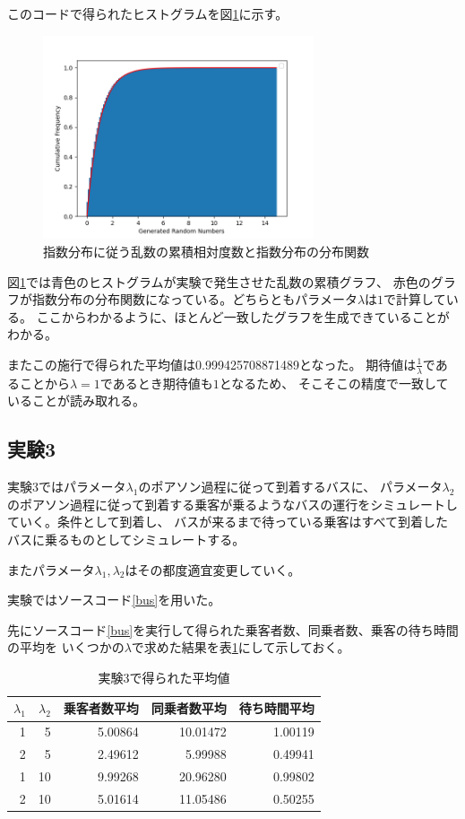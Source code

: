 \documentclass[a4paper,11pt,dvipdfmx]{jsarticle}
\begin{document}
このコードで得られたヒストグラムを図\ref{expohist}に示す。
\begin{figure}[h]
\centering
\includegraphics[width=80mm]{Exporand.png}
\caption{指数分布に従う乱数の累積相対度数と指数分布の分布関数}
\label{expohist}
\end{figure}

図\ref{expohist}では青色のヒストグラムが実験で発生させた乱数の累積グラフ、
赤色のグラフが指数分布の分布関数になっている。どちらともパラメータ$\lambda$は$1$で計算している。
ここからわかるように、ほとんど一致したグラフを生成できていることがわかる。

またこの施行で得られた平均値は0.999425708871489となった。
期待値は$\frac{1}{\lambda}$であることから$\lambda=1$であるとき期待値も$1$となるため、
そこそこの精度で一致していることが読み取れる。

\subsection{実験3}
実験3ではパラメータ$\lambda_1$のポアソン過程に従って到着するバスに、
パラメータ$\lambda_2$のポアソン過程に従って到着する乗客が乗るようなバスの運行をシミュレートしていく。条件として到着し、
バスが来るまで待っている乗客はすべて到着したバスに乗るものとしてシミュレートする。

またパラメータ$\lambda_1,\lambda_2$はその都度適宜変更していく。

実験ではソースコード\ref{bus}を用いた。


先にソースコード\ref{bus}を実行して得られた乗客者数、同乗者数、乗客の待ち時間の平均を
いくつかの$\lambda$で求めた結果を表\ref{result}にして示しておく。
\begin{table}[h]
    \centering
    \caption{実験3で得られた平均値}
    \begin{tabular}{|r|r|r|r|r|} \hline
        $\lambda_1$ & $\lambda_2$ & 乗客者数平均 & 同乗者数平均 & 待ち時間平均 \\ \hline
        1 & 5  & 5.00864 & 10.01472 & 1.00119 \\ \hline
        2 & 5  & 2.49612 & 5.99988  & 0.49941 \\ \hline
        1 & 10 & 9.99268 & 20.96280 & 0.99802 \\ \hline
        2 & 10 & 5.01614 & 11.05486 & 0.50255 \\ \hline
    \end{tabular}
    \label{result}
\end{table}
\end{document}
